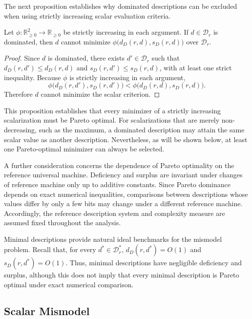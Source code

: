 The next proposition establishes why dominated descriptions can be excluded when using strictly increasing scalar evaluation criteria.

\begin{proposition}
\label{prop:dominated_not_minimal_increasing_scalarization_mismodel}
Let $\phi:\mathbb R_{\ge 0}^2\to\mathbb R_{\ge 0}$ be strictly increasing in each argument. If $d\in\mathcal D_r$ is dominated, then $d$ cannot minimize $\phi\bigl(d_D(r,d),s_D(r,d)\bigr)$ over $\mathcal D_r$.
\end{proposition}
\begin{proof}
Since $d$ is dominated, there exists $d'\in\mathcal D_r$ such that $d_D(r,d')\le d_D(r,d)$ and $s_D(r,d')\le s_D(r,d)$, with at least one strict inequality. Because $\phi$ is strictly increasing in each argument,
\[
\phi\bigl(d_D(r,d'),s_D(r,d')\bigr) < \phi\bigl(d_D(r,d),s_D(r,d)\bigr).
\]
Therefore $d$ cannot minimize the scalar criterion.
\end{proof}

This proposition establishes that every minimizer of a strictly increasing scalarization must be Pareto optimal. For scalarizations that are merely non-decreasing, such as the maximum, a dominated description may attain the same scalar value as another description. Nevertheless, as will be shown below, at least one Pareto-optimal minimizer can always be selected.

A further consideration concerns the dependence of Pareto optimality on the reference universal machine. Deficiency and surplus are invariant under changes of reference machine only up to additive constants. Since Pareto dominance depends on exact numerical inequalities, comparisons between descriptions whose values differ by only a few bits may change under a different reference machine. Accordingly, the reference description system
and complexity measure are assumed fixed throughout the analysis.

Minimal descriptions provide natural ideal benchmarks for the mismodel problem. Recall that, for every $d^\ast\in\mathcal D_r^\ast$, $d_D(r,d^\ast)=O(1)$ and $s_D(r,d^\ast)=O(1)$. Thus, minimal descriptions have negligible deficiency and surplus, although this does not imply that every minimal description is Pareto optimal under exact numerical comparison.


\subsection*{Scalar Mismodel}

